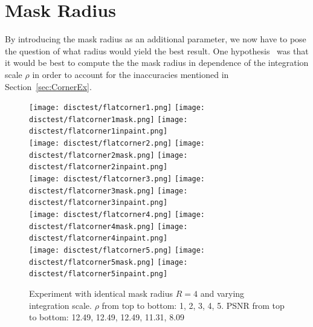 \section{Mask Radius}\label{sec:MaskEx}
By introducing the mask radius as an additional parameter, we now have to pose the question of what
radius would yield the best result. One hypothesis~\cite{conversation} was that it would be best to compute the the
mask radius in dependence of the integration scale $\rho$ in order to account for the inaccuracies
mentioned in Section~\ref{sec:CornerEx}.
\begin{figure}[h]
    \centering
    \texttt{[image: disctest/flatcorner1.png]}\hspace{0.2cm}
    \texttt{[image: disctest/flatcorner1mask.png]}\hspace{0.2cm}
    \texttt{[image: disctest/flatcorner1inpaint.png]}\\
    \vspace*{0.2cm}
    \texttt{[image: disctest/flatcorner2.png]}\hspace{0.2cm}
    \texttt{[image: disctest/flatcorner2mask.png]}\hspace{0.2cm}
    \texttt{[image: disctest/flatcorner2inpaint.png]}\\
    \vspace*{0.2cm}
    \texttt{[image: disctest/flatcorner3.png]}\hspace{0.2cm}
    \texttt{[image: disctest/flatcorner3mask.png]}\hspace{0.2cm}
    \texttt{[image: disctest/flatcorner3inpaint.png]}\\
    \vspace*{0.2cm}
    \texttt{[image: disctest/flatcorner4.png]}\hspace{0.2cm}
    \texttt{[image: disctest/flatcorner4mask.png]}\hspace{0.2cm}
    \texttt{[image: disctest/flatcorner4inpaint.png]}\\
    \vspace*{0.2cm}
    \texttt{[image: disctest/flatcorner5.png]}\hspace{0.2cm}
    \texttt{[image: disctest/flatcorner5mask.png]}\hspace{0.2cm}
    \texttt{[image: disctest/flatcorner5inpaint.png]}\\
    \caption{Experiment with identical mask radius $R=4$ and varying integration scale. $\rho$ from top to bottom:
    1, 2, 3, 4, 5. PSNR from top to bottom: 12.49, 12.49, 12.49, 11.31, 8.09}\label{fig:MaskEx}
\end{figure}
